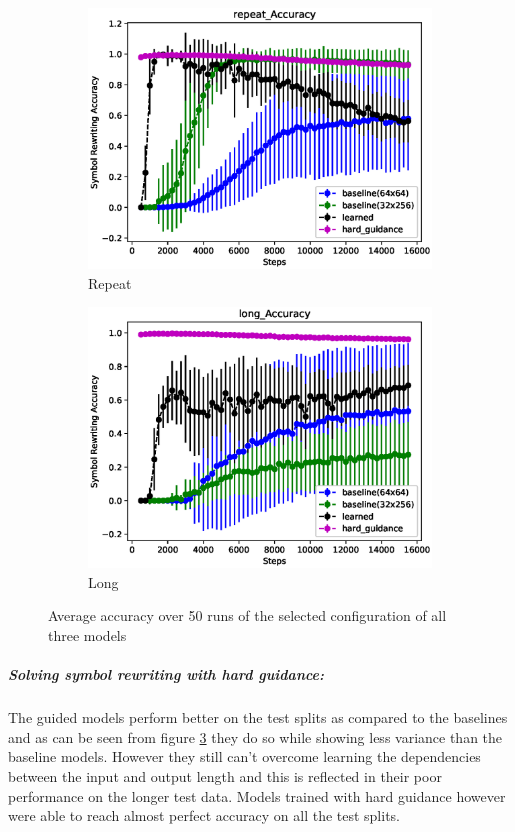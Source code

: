 \begin{figure}[H]
\begin{subfigure}{0.5\linewidth}
		\includegraphics[width=0.95\linewidth]{./figs/sr/repeat-acc-eps}
		\caption{Repeat}\label{repeat-acc}
	\end{subfigure}
	\begin{subfigure}{0.5\linewidth}
		\includegraphics[width=0.95\linewidth]{./figs/sr/long-acc-eps}
		\caption{Long}\label{long-acc}
	\end{subfigure}
	\caption{Average accuracy over 50 runs of the selected configuration of all three models}\label{sr-all-acc}
\end{figure}

\subparagraph{Solving symbol rewriting with hard guidance:} The guided models perform better on the test splits as compared to the baselines and as can be seen from figure \ref{sr-all-acc} they do so while showing less variance than the baseline models. However they still can't overcome learning the dependencies between the input and output length and this is reflected in their poor performance on the longer test data. Models trained with hard guidance however were able to reach almost perfect accuracy on all the test splits.
